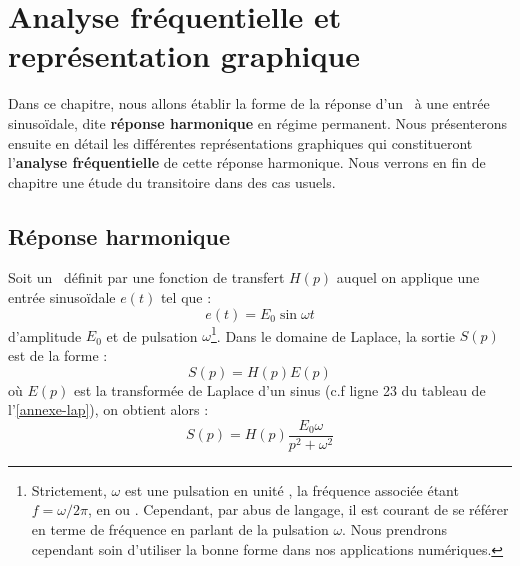\chapter[Analyse fréquentielle]{Analyse fréquentielle et représentation graphique\label{chap-anafreq}}


Dans ce chapitre, nous allons établir la forme de la réponse d'un \SLCI~à une entrée sinuso\"idale, dite 
\textbf{réponse harmonique} en régime permanent.
Nous présenterons ensuite en détail les différentes représentations graphiques qui 
constitueront l'\textbf{analyse fréquentielle} de cette réponse harmonique.
Nous verrons en fin de chapitre une étude du transitoire dans des cas usuels.


\section{Réponse harmonique}


Soit un \SLCI~définit par une fonction de transfert $H(p)$ auquel on applique 
une entrée sinuso\"idale $e(t)$ tel que :
$$
e(t)=E_0\sin\omega t 
$$
d'amplitude $E_0$ et de pulsation $\omega$\footnote{Strictement, $\omega$ est une 
pulsation en unité \unit{}{\radian\per\second}, la fréquence associée étant $f=\omega/2\pi$, 
en \unit{}{\reciprocal\second} ou \unit{}{\hertz}. Cependant, 
par abus de langage, il est courant de se référer en terme de fréquence en parlant de la pulsation $\omega$. 
Nous prendrons cependant soin d'utiliser la bonne forme dans nos applications numériques.}.
Dans le domaine de Laplace, la sortie $S(p)$ est de la forme :
$$
S(p)=H(p)E(p)
$$
où $E(p)$ est la transformée de Laplace d'un sinus (c.f ligne 23 du tableau de l'\cref{annexe-lap}), 
on obtient alors :
$$
S(p)=H(p)\dfrac{E_0\omega}{p^2+\omega^2}
$$

